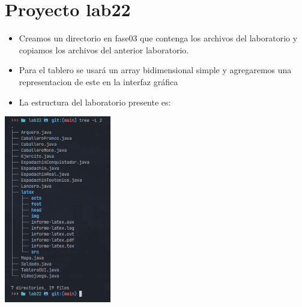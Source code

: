 \newpage %
\section{Proyecto lab22}
\begin{itemize}
  \item Creamos un directorio en fase03 que contenga los archivos del laboratorio y copiamos los archivos del anterior laboratorio.
  \item Para el tablero se usará un array bidimensional simple y agregaremos una representacion de este en la interfaz gráfica
  \item La estructura del laboratorio presente es:
\end{itemize}
\includegraphics[width=0.35\textwidth]{img/tree.jpg}
